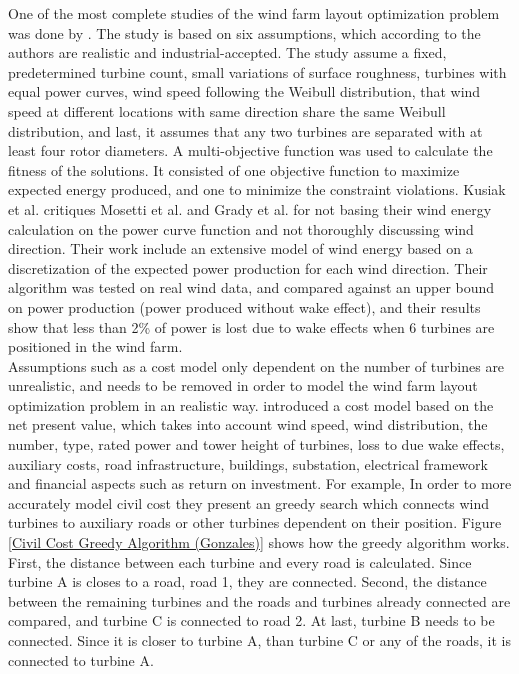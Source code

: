 \noindent One of the most complete studies of the wind farm layout optimization problem was done by \cite{Kusiak}. The study is based on six assumptions, which according to the authors are realistic and industrial-accepted. The study assume a fixed, predetermined turbine count, small variations of surface roughness, turbines with equal power curves, wind speed following the Weibull distribution, that wind speed at different locations with same direction share the same Weibull distribution, and last, it assumes that any two turbines are separated with at least four rotor diameters. A multi-objective function was used to calculate the fitness of the solutions. It consisted of one objective function to maximize expected energy produced, and one to minimize the constraint violations. Kusiak et al. critiques Mosetti et al. and Grady et al. for not basing their wind energy calculation on the power curve function and not thoroughly discussing wind direction. Their work include an extensive model of wind energy based on a discretization of the expected power production for each wind direction. Their algorithm was tested on real wind data, and compared against an upper bound on power production (power produced without wake effect), and their results show that less than 2\% of power is lost due to wake effects when 6 turbines are positioned in the wind farm. \\


\noindent Assumptions such as a cost model only dependent on the number of turbines are unrealistic, and needs to be removed in order to model the wind farm layout optimization problem in an realistic way.  \cite{Gonzalez} introduced a cost model based on the net present value, which takes into account wind speed, wind distribution, the number, type, rated power and tower height of turbines, loss to due wake effects, auxiliary costs, road infrastructure, buildings, substation, electrical framework and financial aspects such as return on investment. For example, In order to more accurately model civil cost they present an greedy search which connects wind turbines to auxiliary roads or other turbines dependent on their position. Figure \ref{Civil Cost Greedy Algorithm (Gonzales)} shows how the greedy algorithm works. First, the distance between each turbine and every road is calculated. Since turbine A is closes to a road, road 1, they are connected. Second, the distance between the remaining turbines and the roads and turbines already connected are compared, and turbine C is connected to road 2. At last, turbine B needs to be connected. Since it is closer to turbine A, than turbine C or any of the roads, it is connected to turbine A.\\


